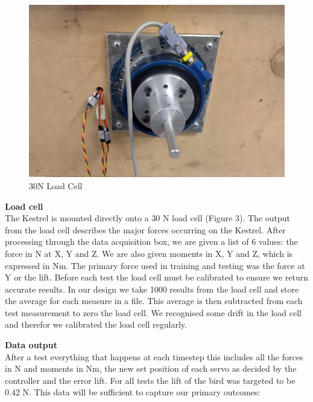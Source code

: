     \setlength{\intextsep}{0pt}
    \begin{figure}
        \includegraphics[width=\textwidth/2]{./Resources/Fig3_load_cell.jpg}
        \caption{\label{fig:figure 3} 30N Load Cell}
    \end{figure}
    \quad\textbf{Load cell}\\
    The Kestrel is mounted directly onto a 30 N load cell (Figure 3). The
    output from the load cell describes the major forces occurring on the
    Kestrel. After processing through the data acquisition box, we are given
    a list of 6 values: the force in N at X, Y and Z. We are also given
    moments in X, Y and Z, which is expressed in Nm. The primary force used
    in training and testing was the force at Y or the lift.
    \vspace{\baselineskip}
    Before each test the load cell must be calibrated to ensure we return
    accurate results. In our design we take 1000 results from the load cell
    and store the average for each measure in a file. This average is then
    subtracted from each test measurement to zero the load cell. We recognised
    some drift in the load cell and therefor we calibrated the load cell regularly.
    \vspace{\baselineskip}

    \quad\textbf{Data output}\\
    After a test everything that happens at each timestep this includes all the
    forces in N and moments in Nm, the new set position of each servo as decided by
    the controller and the error lift. For all tests the lift of the bird was
    targeted to be 0.42 N.
    This data will be sufficient to capture our primary outcomes:

